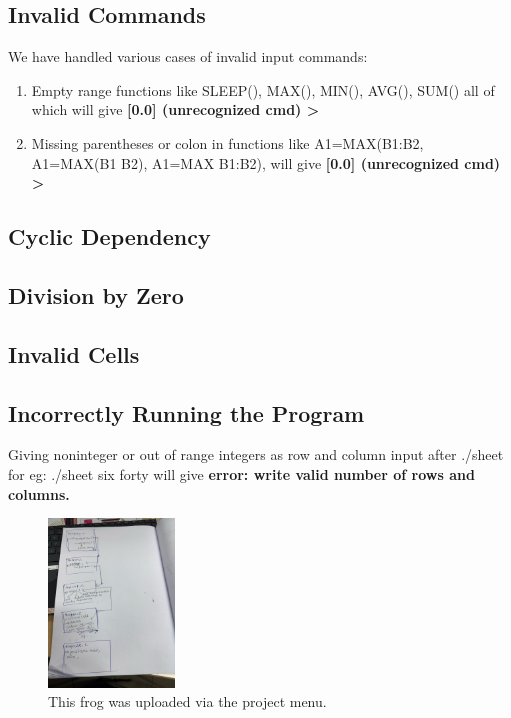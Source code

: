 \documentclass[a4paper]{article}
\begin{document}
\subsection{Invalid Commands}

We have handled various cases of invalid input commands:
\begin{enumerate}
\item Empty range functions like SLEEP(), MAX(), MIN(), AVG(), SUM() all of which will give \textbf{[0.0] (unrecognized cmd) >}
\item Missing parentheses or colon in functions like A1=MAX(B1:B2, A1=MAX(B1 B2), A1=MAX B1:B2), will give \textbf{[0.0] (unrecognized cmd) >} 
\end{enumerate}

\subsection{Cyclic Dependency}





\subsection{Division by Zero}



\subsection{Invalid Cells}


\subsection{Incorrectly Running the Program}

Giving noninteger or out of range integers as row and column input after ./sheet for eg: ./sheet six forty will give \textbf{error: write valid number of rows and columns.}



\begin{figure}
\centering
\includegraphics[width=0.3\textwidth]{copass.jpg}
\caption{\label{fig:frog}This frog was uploaded via the project menu.}
\end{figure}
\end{document}
